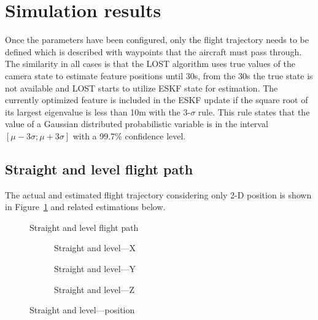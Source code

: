 \section{Simulation results}

Once the parameters have been configured, only the flight trajectory needs to be defined which is described with waypoints that the aircraft must pass through. The similarity in all cases is that the LOST algorithm uses true values of the camera state to estimate feature positions until 30\si{\second}, from the 30\si{\second} the true state is not available and LOST starts to utilize ESKF state for estimation. The currently optimized feature is included in the ESKF update if the square root of its largest eigenvalue is less than 10\si{\meter} with the 3-$\sigma$ rule. This rule states that the value of a Gaussian distributed probabilistic variable is in the interval $[\mu-3\sigma;\mu+3\sigma]$ with a 99.7\% confidence level.

\subsection{Straight and level flight path}

The actual and estimated flight trajectory considering only 2-D position is shown in Figure~\ref{fig:straight-level} and related estimations below.

\begin{figure}[!ht]
    \centering
    
    \caption{Straight and level flight path}\label{fig:straight-level}
\end{figure}

\begin{figure}[!ht]
    \centering
    \begin{subfigure}{0.3\textwidth}
        
        \caption{Straight and level---X}
    \end{subfigure}
    \hfill
    \begin{subfigure}{0.3\textwidth}
        
        \caption{Straight and level---Y}
    \end{subfigure}
    \hfill
    \begin{subfigure}{0.3\textwidth}
        
        \caption{Straight and level---Z}
    \end{subfigure}
    \caption{Straight and level---position}\label{fig:straight-level-pos}
\end{figure}

